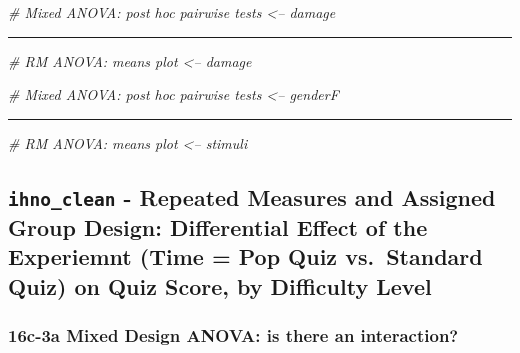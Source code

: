 \documentclass[]{article}
\newenvironment{Shaded}{\begin{snugshade}}{\end{snugshade}}
\newcommand{\CommentTok}[1]{\textcolor[rgb]{0.56,0.35,0.01}{\textit{#1}}}
\begin{document}
\begin{Shaded}
\begin{Highlighting}[]
\CommentTok{# Mixed ANOVA: post hoc pairwise tests <-- damage}
\end{Highlighting}
\end{Shaded}

\begin{center}\rule{0.5\linewidth}{\linethickness}\end{center}

\begin{Shaded}
\begin{Highlighting}[]
\CommentTok{# RM ANOVA: means plot <-- damage}
\end{Highlighting}
\end{Shaded}

\clearpage

\begin{Shaded}
\begin{Highlighting}[]
\CommentTok{# Mixed ANOVA: post hoc pairwise tests <-- genderF}
\end{Highlighting}
\end{Shaded}

\begin{center}\rule{0.5\linewidth}{\linethickness}\end{center}

\begin{Shaded}
\begin{Highlighting}[]
\CommentTok{# RM ANOVA: means plot <-- stimuli}
\end{Highlighting}
\end{Shaded}

\clearpage

\subsection{\texorpdfstring{\texttt{ihno\_clean} - Repeated Measures and
Assigned Group Design: Differential Effect of the Experiemnt (Time = Pop
Quiz vs.~Standard Quiz) on Quiz Score, by Difficulty
Level}{ihno\_clean - Repeated Measures and Assigned Group Design: Differential Effect of the Experiemnt (Time = Pop Quiz vs.~Standard Quiz) on Quiz Score, by Difficulty Level}}\label{ihno_clean---repeated-measures-and-assigned-group-design-differential-effect-of-the-experiemnt-time-pop-quiz-vs.standard-quiz-on-quiz-score-by-difficulty-level}

\subsubsection{16c-3a Mixed Design ANOVA: is there an
interaction?}\label{c-3a-mixed-design-anova-is-there-an-interaction}
\end{document}
